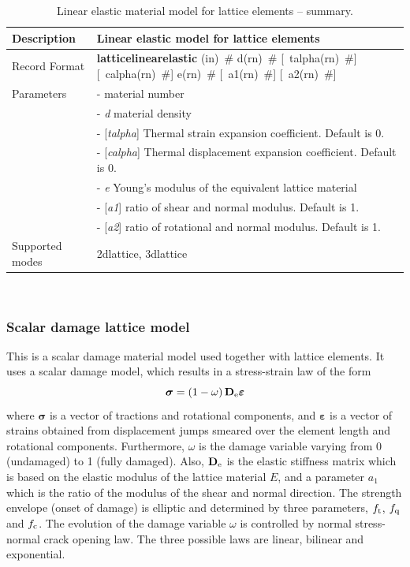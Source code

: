 \documentclass[a4paper]{article}
\newcommand{\descitem}[1]{{\noindent \bf #1}}
\newcommand{\elemparam}[2]{{{#1\tiny (#2)}~\#}}
\newcommand{\optelemparam}[2]{[{~\elemparam{#1}{#2}}]}
\newcommand{\param}[1]{{\it #1}}
\newcommand{\optparam}[1]{[{\it #1}]}
\newenvironment{mmt}{\begin{tabular}{|l|p{9cm}|}}{\end{tabular}\\}
\newenvironment{mmt}{\begin{tabular}{|l|l|}}{\end{tabular}\\}
\begin{document}
\begin{table}[!htb]
\begin{mmt}
\hline
Description & Linear elastic model for lattice elements \\
\hline
Record Format & \descitem{latticelinearelastic} \elemparam{}{in} 
\elemparam{d}{rn} \optelemparam{talpha}{rn} \optelemparam{calpha}{rn} \elemparam{e}{rn} \optelemparam{a1}{rn} \optelemparam{a2}{rn}\\
Parameters &- \param{} material number\\
&- \param{d} material density\\
&- \optparam{talpha} Thermal strain expansion coefficient. Default is 0.\\
&- \optparam{calpha} Thermal displacement expansion coefficient. Default is 0.\\
&- \param{e} Young's modulus of the equivalent lattice material\\
&- \optparam{a1} ratio of shear and normal modulus. Default is 1.\\
&- \optparam{a2} ratio of rotational and normal modulus. Default is 1.\\
Supported modes & 2dlattice, 3dlattice\\
\hline
\end{mmt}
\caption{Linear elastic material model for lattice elements -- summary.}
\label{latticelinearelastic_table}
\end{table}

\subsubsection{Scalar damage lattice model}
This is a scalar damage material model used together with lattice elements.
It uses a scalar damage model, which results in a stress-strain law of the form
\begin{equation}
\boldsymbol{\sigma} = \left(1-\omega\right) \mathbf{D}_{\rm e} \boldsymbol{\varepsilon}
\end{equation}
where $\boldsymbol{\sigma}$ is a vector of tractions and rotational components, and $\boldsymbol{\varepsilon}$ is a vector of strains obtained from displacement jumps smeared over the element length and rotational components.
Furthermore, $\omega$ is the damage variable varying from 0 (undamaged) to 1 (fully damaged). 
Also, $\mathbf{D}_{\rm e}$ is the elastic stiffness matrix which is based on the elastic modulus of the lattice material $E$, and a parameter $a_1$ which is the ratio of the modulus of the shear and normal direction.
The strength envelope (onset of damage) is elliptic and determined by three  parameters, $f_{\rm t}$, $f_{\rm q}$ and $f_{\rm c}$. The evolution of the damage variable $\omega$ is controlled by normal stress-normal crack opening law. The three possible laws are linear, bilinear and exponential.
\end{document}

